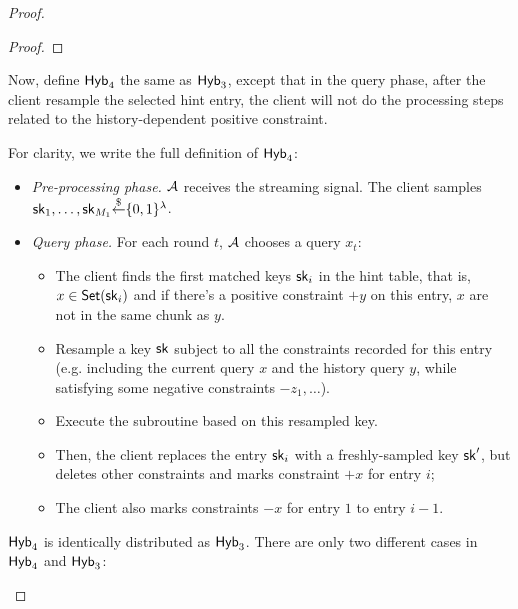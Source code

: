 \begin{proof}
\begin{proof}
    \end{proof}
    
    Now, define ${\sf Hyb}_4$ the same as ${\sf Hyb}_3$, except that in the query phase, after the client resample the selected hint entry, the client will not do the processing steps related to the history-dependent positive constraint.
    
    For clarity, we write the full definition of ${\sf Hyb}_4$:
    
    \begin{itemize}
        \item \textit{Pre-processing phase.} $\mathcal{A}$ receives the streaming signal. The client samples $\mathsf{sk}_1,\dots,\mathsf{sk}_{M_1}{\overset{\$}{\leftarrow}}\{0,1\}^\lambda$. %
        \item \textit{Query phase.} For each round $t$, $\mathcal{A}$ chooses a query $x_t$:
        \begin{itemize}
            \item The client finds the first matched keys $\mathsf{sk}_i$ in the hint table, that is, $x\in\mathsf{Set}(\mathsf{sk}_i)$ and if there's a positive constraint $+y$ on this entry, $x$ are not in the same chunk as $y$.
            
            \item Resample a key $\mathsf{sk}$ subject to all the constraints recorded for this entry (e.g. including the current query $x$ and the history query $y$, while satisfying some negative constraints $-z_1,\dots$). 
            
            \item Execute the subroutine based on this resampled key. 
            
            \item Then, the client replaces the entry $\mathsf{sk}_i$ with a freshly-sampled key $\mathsf{sk}'$, but deletes other constraints and marks constraint $+x$ for entry $i$;
            
            \item The client also marks constraints $-x$ for entry $1$ to entry $i-1$.
            
        \end{itemize}
        
    \end{itemize}
    
    
    ${\sf Hyb}_4$ is identically distributed as ${\sf Hyb}_3$. There are only two different cases in ${\sf Hyb}_4$ and ${\sf Hyb}_3$:
    
    \begin{itemize}
        

\end{itemize}
\end{proof}
